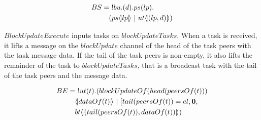 \begin{align*}
    BS &=\ !bu.(d).ps(lp).\\
    &\quad (ps \langle \! | lp | \! \rangle\ |\ ut \langle \! | (lp,d) | \! \rangle)
\end{align*}

$BlockUpdateExecute$ inputs tasks on $blockUpdateTasks$. When a task is received, it lifts a message on the $blockUpdate$ channel of the head of the task peers with the task message data. If the tail of the task peers is non-empty, it also lifts the remainder of the task to $blockUpdateTasks$, that is a broadcast task with the tail of the task peers and the message data.

\begin{align*}
    BE &=\ !ut(t).(blockUpdateOf(head(peersOf(t)))\\
    &\quad  \langle \! | dataOf(t) | \! \rangle\ |\ [tail(peersOf(t))=el,\mathbf{0},\\
    &\quad bt \langle \! | (tail(peersOf(t)),dataOf(t)) | \! \rangle)
\end{align*}
